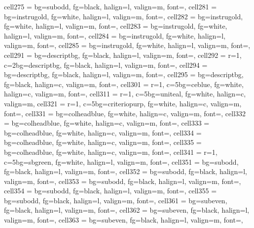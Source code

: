 \documentclass[a4paper,12pt]{article}
\begin{document}
\begin{longtblr}
{  cell{27}{5} = {bg=subodd,  fg=black, halign=l, valign=m, font=\footnotesize},
  cell{28}{1} = {bg=instrugold, fg=white, halign=l, valign=m, font=\footnotesize},
  cell{28}{2} = {bg=instrugold, fg=white, halign=l, valign=m, font=\footnotesize},
  cell{28}{3} = {bg=instrugold, fg=white, halign=l, valign=m, font=\footnotesize},
  cell{28}{4} = {bg=instrugold, fg=white, halign=l, valign=m, font=\footnotesize},
  cell{28}{5} = {bg=instrugold, fg=white, halign=l, valign=m, font=\footnotesize},
  cell{29}{1} = {bg=descriptbg, fg=black, halign=l, valign=m, font=\footnotesize},
  cell{29}{2} = {r=1, c=2}{bg=descriptbg, fg=black, halign=l, valign=m, font=\footnotesize},
  cell{29}{4} = {bg=descriptbg, fg=black, halign=l, valign=m, font=\footnotesize},
  cell{29}{5} = {bg=descriptbg, fg=black, halign=c, valign=m, font=\footnotesize\bfseries},
  cell{30}{1} = {r=1, c=5}{bg=ceblue, fg=white, halign=c, valign=m, font=\small\bfseries},
  cell{31}{1} = {r=1, c=5}{bg=uniteal, fg=white, halign=c, valign=m},
  cell{32}{1} = {r=1, c=5}{bg=criteriopurp, fg=white, halign=c, valign=m, font=\small\bfseries},
  cell{33}{1} = {bg=colheadblue, fg=white, halign=c, valign=m, font=\bfseries},
  cell{33}{2} = {bg=colheadblue, fg=white, halign=c, valign=m, font=\bfseries},
  cell{33}{3} = {bg=colheadblue, fg=white, halign=c, valign=m, font=\bfseries},
  cell{33}{4} = {bg=colheadblue, fg=white, halign=c, valign=m, font=\bfseries},
  cell{33}{5} = {bg=colheadblue, fg=white, halign=c, valign=m, font=\bfseries},
  cell{34}{1} = {r=1, c=5}{bg=sbgreen, fg=white, halign=l, valign=m, font=\small\bfseries},
  cell{35}{1} = {bg=subodd,  fg=black, halign=l, valign=m, font=\footnotesize},
  cell{35}{2} = {bg=subodd,  fg=black, halign=l, valign=m, font=\footnotesize},
  cell{35}{3} = {bg=subodd,  fg=black, halign=l, valign=m, font=\footnotesize},
  cell{35}{4} = {bg=subodd,  fg=black, halign=l, valign=m, font=\footnotesize},
  cell{35}{5} = {bg=subodd,  fg=black, halign=l, valign=m, font=\footnotesize},
  cell{36}{1} = {bg=subeven, fg=black, halign=l, valign=m, font=\footnotesize},
  cell{36}{2} = {bg=subeven, fg=black, halign=l, valign=m, font=\footnotesize},
  cell{36}{3} = {bg=subeven, fg=black, halign=l, valign=m, font=\footnotesize},
}
\end{longtblr}
\end{document}
